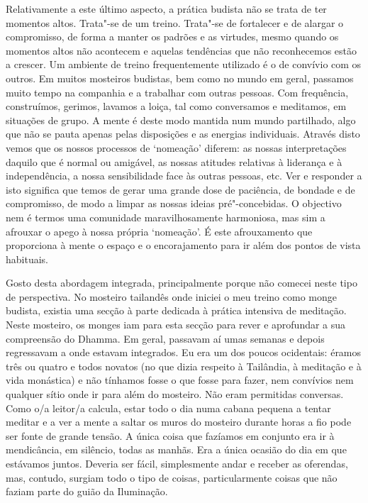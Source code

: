 Relativamente a este último aspecto, a prática budista não se trata de ter momentos altos. Trata"-se de um treino. Trata"-se de fortalecer e de alargar o compromisso, de forma a manter os padrões e as virtudes, mesmo quando os momentos altos não acontecem e aquelas tendências que não reconhecemos estão a crescer. Um ambiente de treino frequentemente utilizado é o de convívio com os outros. Em muitos mosteiros budistas, bem como no mundo em geral, passamos muito tempo na companhia e a trabalhar com outras pessoas. Com frequência, construímos, gerimos, lavamos a loiça, tal como conversamos e meditamos, em situações de grupo. A mente é deste modo mantida num mundo partilhado, algo que não se pauta apenas pelas disposições e as energias individuais. Através disto vemos que os nossos processos de `nomeação' diferem: as nossas interpretações daquilo que é normal ou amigável, as nossas atitudes relativas à liderança e à independência, a nossa sensibilidade face às outras pessoas, etc. Ver e responder a isto significa que temos de gerar uma grande dose de paciência, de bondade e de compromisso, de modo a limpar as nossas ideias pré"-concebidas. O objectivo nem é termos uma comunidade maravilhosamente harmoniosa, mas sim a afrouxar o apego à nossa própria `nomeação'. É este afrouxamento que proporciona à mente o espaço e o encorajamento para ir além dos pontos de vista habituais.

Gosto desta abordagem integrada, principalmente porque não comecei neste tipo de perspectiva. No mosteiro tailandês onde iniciei o meu treino como monge budista, existia uma secção à parte dedicada à prática intensiva de meditação. Neste mosteiro, os monges iam para esta secção para rever e aprofundar a sua compreensão do Dhamma. Em geral, passavam aí umas semanas e depois regressavam a onde estavam integrados. Eu era um dos poucos ocidentais: éramos três ou quatro e todos novatos (no que dizia respeito à Tailândia, à meditação e à vida monástica) e não tínhamos fosse o que fosse para fazer, nem convívios nem qualquer sítio onde ir para além do mosteiro. Não eram permitidas conversas. Como o/a leitor/a calcula, estar todo o dia numa cabana pequena a tentar meditar e a ver a mente a saltar os muros do mosteiro durante horas a fio pode ser fonte de grande tensão. A única coisa que fazíamos em conjunto era ir à mendicância, em silêncio, todas as manhãs. Era a única ocasião do dia em que estávamos juntos. Deveria ser fácil, simplesmente andar e receber as oferendas, mas, contudo, surgiam todo o tipo de coisas, particularmente coisas que não faziam parte do guião da Iluminação.

